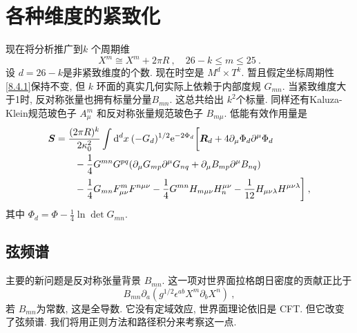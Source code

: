 \section{各种维度的紧致化} \label{sec:8.4}%
现在将分析推广到$k$ 个周期维
\begin{equation}
	X^{m} \cong X^{m}+2 \pi R \:, \quad 26-k \leq m \leq  25 \:. \label{8.4.1}
\end{equation}
设 $d=26-k$是非紧致维度的个数. 现在时空是 $M^{d} \times T^{k}$. 暂且假定坐标周期性 \eqref{8.4.1}保持不变, 但 $k$ 环面的真实几何实际上依赖于内部度规 $G_{m n}$. 当紧致维度大于1时, 反对称张量也拥有标量分量$B_{m n}$. 这总共给出 $k^{2}$个标量. 
同样还有Kaluza-Klein规范玻色子 $A_{\mu}^{m}$ 和反对称张量规范玻色子 $B_{m \mu}$. 低能有效作用量是
	\begin{align}
		\bm{S} &= \frac{(2 \pi R)^{k}}{2 \kappa_{0}^{2}} \int \mathrm{d}^{d} x \: (-G_{d})^{1/2} \mathrm{e}^{-2 \Phi_{d}}
		\biggl[\bm{R}_{d}+4 \partial_{\mu} \Phi_{d} \partial^{\mu} \Phi_{d} \nonumber \\
		&\qquad -\frac{1}{4} G^{m n} G^{p q} (\partial_{\mu} G_{m p} \partial^{\mu} G_{n q}+\partial_{\mu} B_{m p} \partial^{\mu} B_{n q})  \nonumber \\
		&\qquad -\frac{1}{4} G_{m n} F_{\mu \nu}^{m} F^{n \mu \nu}-\frac{1}{4} G^{m n} H_{m \mu \nu} H_{n}^{\mu \nu}
		-\frac{1}{12} H_{\mu \nu \lambda} H^{\mu \nu \lambda}\biggr] \:, \label{8.4.2}
	\end{align}
其中 $\Phi_{d}=\Phi-\frac{1}{4} \ln \operatorname{det} G_{m n}$.

\subsection*{弦频谱}
主要的新问题是反对称张量背景 $B_{mn}$. 这一项对世界面拉格朗日密度的贡献正比于
\begin{equation}
	B_{m n} \partial_{a}(g^{1 / 2} \epsilon^{a b} X^{m} \partial_{b} X^{n}) \:, \label{8.4.3}
\end{equation}
若 $B_{m n}$为常数, 这是全导数. 它没有定域效应, 世界面理论依旧是 CFT. 但它改变了弦频谱. 我们将用正则方法和路径积分来考察这一点.

